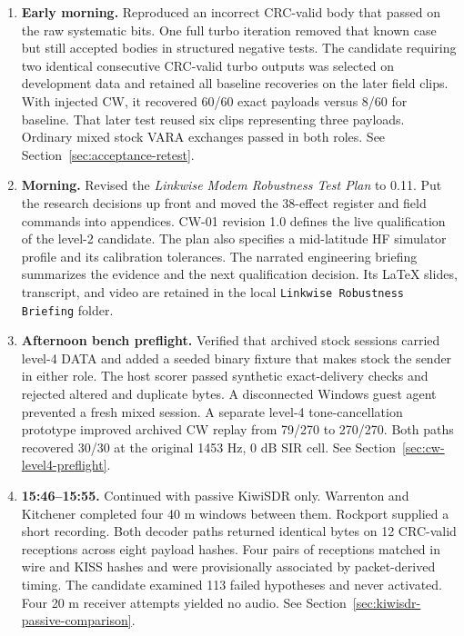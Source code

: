 \documentclass[11pt,a4paper]{article}
\begin{document}
\begin{enumerate}[leftmargin=*]
\item \textbf{Early morning.} Reproduced an incorrect CRC-valid body that
      passed on the raw systematic bits. One full turbo iteration removed that
      known case but still accepted bodies in structured negative tests. The
      candidate requiring two identical consecutive CRC-valid turbo outputs
      was selected on development data and retained all baseline recoveries
      on the later field clips. With injected CW, it recovered 60/60 exact
      payloads versus 8/60 for baseline. That later test reused six clips
      representing three payloads. Ordinary mixed stock VARA exchanges passed
      in both roles. See Section~\ref{sec:acceptance-retest}.
\item \textbf{Morning.} Revised the \emph{Linkwise Modem Robustness Test
      Plan} to 0.11. Put the research decisions up front and moved the 38-effect
      register and field commands into appendices. CW-01 revision 1.0 defines
      the live qualification of the level-2 candidate. The plan also specifies
      a mid-latitude HF simulator profile and its calibration tolerances. The
      narrated engineering briefing summarizes the evidence and the next
      qualification decision. Its LaTeX slides, transcript, and video are
      retained in the local \texttt{Linkwise Robustness Briefing} folder.
\item \textbf{Afternoon bench preflight.} Verified that archived stock
      sessions carried level-4 DATA and added a seeded binary fixture that
      makes stock the sender in either role. The host scorer passed synthetic
      exact-delivery checks and rejected altered and duplicate bytes. A
      disconnected Windows guest agent prevented a fresh mixed session. A
      separate level-4 tone-cancellation prototype improved archived CW replay
      from 79/270 to 270/270. Both paths recovered 30/30 at the original
      1453 Hz, 0 dB SIR cell. See Section~\ref{sec:cw-level4-preflight}.
\item \textbf{15:46--15:55.} Continued with passive KiwiSDR only. Warrenton
      and Kitchener completed four 40 m windows between them. Rockport supplied
      a short recording. Both decoder paths returned identical bytes on 12
      CRC-valid receptions across eight payload hashes. Four pairs of receptions
      matched in wire and KISS hashes and were provisionally associated by
      packet-derived timing.
      The candidate examined 113 failed hypotheses and never activated. Four
      20 m receiver attempts yielded no audio. See
      Section~\ref{sec:kiwisdr-passive-comparison}.
\end{enumerate}
\end{document}
